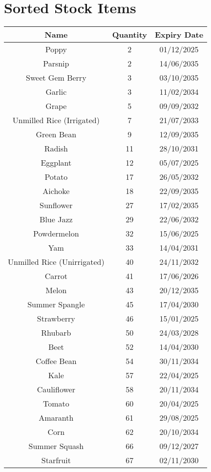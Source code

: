 \documentclass{article}
\begin{document}
\section*{Sorted Stock Items}
\begin{tabular}{|c|c|c|}
\hline
Name & Quantity & Expiry Date\\
\hline
Poppy & 2 & 01/12/2025 \\
\hline
Parsnip & 2 & 14/06/2035 \\
\hline
Sweet Gem Berry & 3 & 03/10/2035 \\
\hline
Garlic & 3 & 11/02/2034 \\
\hline
Grape & 5 & 09/09/2032 \\
\hline
Unmilled Rice (Irrigated) & 7 & 21/07/2033 \\
\hline
Green Bean & 9 & 12/09/2035 \\
\hline
Radish & 11 & 28/10/2031 \\
\hline
Eggplant & 12 & 05/07/2025 \\
\hline
Potato & 17 & 26/05/2032 \\
\hline
Aichoke & 18 & 22/09/2035 \\
\hline
Sunflower & 27 & 17/02/2035 \\
\hline
Blue Jazz & 29 & 22/06/2032 \\
\hline
Powdermelon & 32 & 15/06/2025 \\
\hline
Yam & 33 & 14/04/2031 \\
\hline
Unmilled Rice (Unirrigated) & 40 & 24/11/2032 \\
\hline
Carrot & 41 & 17/06/2026 \\
\hline
Melon & 43 & 20/12/2035 \\
\hline
Summer Spangle & 45 & 17/04/2030 \\
\hline
Strawberry & 46 & 15/01/2025 \\
\hline
Rhubarb & 50 & 24/03/2028 \\
\hline
Beet & 52 & 14/04/2030 \\
\hline
Coffee Bean & 54 & 30/11/2034 \\
\hline
Kale & 57 & 22/04/2025 \\
\hline
Cauliflower & 58 & 20/11/2034 \\
\hline
Tomato & 60 & 20/04/2025 \\
\hline
Amaranth & 61 & 29/08/2025 \\
\hline
Corn & 62 & 20/10/2034 \\
\hline
Summer Squash & 66 & 09/12/2027 \\
\hline
Starfruit & 67 & 02/11/2030 \\

\end{tabular}
\end{document}
